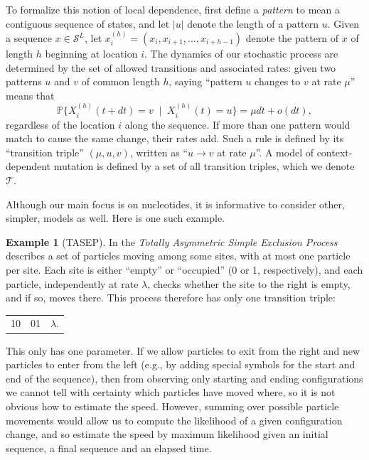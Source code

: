 \documentclass{article}
\renewcommand{\P}{\mathbb{P}}
\newcommand{\calS}{\mathcal{S}}  %
\newcommand{\calT}{\mathcal{T}}  %
\newcommand{\given}{\;\mid\;}
\theoremstyle{plain}
\theoremstyle{definition}
\newtheorem{example}{Example}[section]
\begin{document}
To formalize this notion of local dependence,
first define a \textit{pattern} to mean a contiguous sequence of states,
and let $|u|$ denote the length of a pattern $u$.
Given a sequence $x \in \calS^L$,
let $x_i^{(h)} = (x_i, x_{i+1}, \ldots, x_{i+h-1})$ denote the pattern of $x$ of length $h$ beginning at location $i$.
The dynamics of our stochastic process
are determined by the set of allowed transitions and associated rates:
given two patterns $u$ and $v$ of common length $h$,
saying ``pattern $u$ changes to $v$ at rate $\mu$'' means that
\[
    \P\{ X_i^{(h)}(t+dt) = v \given X_i^{(h)}(t) = u \} = \mu dt + o(dt),
\]
regardless of the location $i$ along the sequence.
If more than one pattern would match to cause the same change, their rates add.
Such a rule is defined by its ``transition triple'' $(\mu,u,v)$,
written as ``$u \to v$ at rate $\mu$''.
A model of context-dependent mutation
is defined by a set of all transition triples,
which we denote $\calT$.

Although our main focus is on nucleotides,
it is informative to consider other, simpler, models as well.
Here is one such example.

\begin{example}[TASEP]
  In the \emph{Totally Asymmetric Simple Exclusion Process}
  describes a set of particles moving among some sites,
  with at most one particle per site.
  Each site is either ``empty'' or ``occupied''
  (0 or 1, respectively),
  and each particle, independently at rate $\lambda$,
  checks whether the site to the right is empty,
  and if so, moves there.
  This process therefore has only one transition triple:

  \begin{center}
    \begin{tabular}{c@{\quad$\to$\quad}c@{\quad at rate\quad }c}
      10  &   01   &  $\lambda$.
    \end{tabular}
  \end{center}

  \noindent
  This only has one parameter.
  If we allow particles to exit from the right and new particles to enter from the left
  (e.g., by adding special symbols for the start and end of the sequence),
  then from observing only starting and ending configurations
  we cannot tell with certainty which particles have moved where,
  so it is not obvious how to estimate the speed.
  However, summing over possible particle movements would allow us to
  compute the likelihood of a given configuration change,
  and so estimate the speed by maximum likelihood
  given an initial sequence, a final sequence and an elapsed time.

\end{example}
\end{document}
